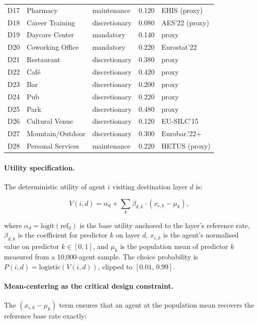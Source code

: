 \documentclass[a4paper,12pt]{article}
\begin{document}
\begin{table}[H]
\begin{tabularx}{\textwidth}{p{0.7cm}p{3.3cm}Xr l}
D17 & Pharmacy             & maintenance    & 0.120 & EHIS (proxy) \\
D18 & Career Training      & discretionary  & 0.080 & AES'22 (proxy) \\
D19 & Daycare Center       & mandatory      & 0.140 & proxy \\
D20 & Coworking Office     & mandatory      & 0.220 & Eurostat'22 \\
D21 & Restaurant           & discretionary  & 0.380 & proxy \\
D22 & Caf\'e               & discretionary  & 0.420 & proxy \\
D23 & Bar                  & discretionary  & 0.200 & proxy \\
D24 & Pub                  & discretionary  & 0.220 & proxy \\
D25 & Park                 & discretionary  & 0.480 & proxy \\
D26 & Cultural Venue       & discretionary  & 0.120 & EU-SILC'15 \\
D27 & Mountain/Outdoor     & discretionary  & 0.300 & Eurobar.'22+ \\
D28 & Personal Services    & maintenance    & 0.220 & HETUS (proxy) \\
\bottomrule
\end{tabularx}
\end{table}

\paragraph{Utility specification.}
The deterministic utility of agent $i$ visiting destination layer $d$ is:

\begin{equation}
  V(i,d) = \alpha_d + \sum_k \beta_{d,k} \cdot (x_{i,k} - \mu_k),
  \label{eq:rum_utility}
\end{equation}

where $\alpha_d = \mathrm{logit}(\mathrm{ref}_d)$ is the base utility
anchored to the layer's reference rate, $\beta_{d,k}$ is the coefficient for
predictor $k$ on layer $d$, $x_{i,k}$ is the agent's normalised value on
predictor $k \in [0,1]$, and $\mu_k$ is the population mean of predictor $k$
measured from a 10,000-agent sample. The choice probability is
$P(i,d) = \mathrm{logistic}(V(i,d))$, clipped to $[0.01,\,0.99]$.

\paragraph{Mean-centering as the critical design constraint.}
The $(x_{i,k} - \mu_k)$ term ensures that an agent at the population mean
recovers the reference base rate exactly:
\end{document}
